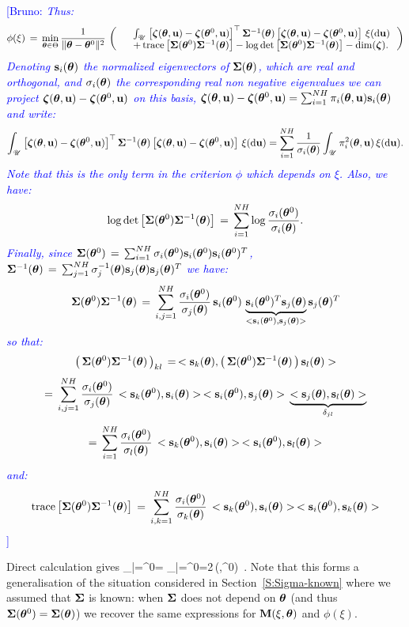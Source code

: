\documentclass{article}
\newcommand{\B}[1]{{\textcolor{blue}{[Bruno: \textit{#1}]}}}
\begin{document}
\B{Thus:
%
$$
\phi(\xi)\,=\, 
\min_{\mtb\in\Theta} \frac{1}{\|\mtb-\mtb^0\|^2} \,  \pare{ \begin{array}{ll}
&\int_\SU \left[\zetab(\mtb,\ub) - \zetab(\mtb^0,\ub)\right]\TT \Sigmab^{-1}(\mtb)\left[\zetab(\mtb,\ub) - \zetab(\mtb^0,\ub)\right] \, \xi(\dd\ub)\\
&+\, \tr\left[\Sigmab(\mtb^0)\Sigmab^{-1}(\mtb)\right] - \log \det\left[\Sigmab(\mtb^0)\Sigmab^{-1}(\mtb)\right] - \dim(\zetab).
\end{array}
%
}
$$
%
Denoting $\vs_i(\mtb)$ the normalized eigenvectors of $\Sigmab(\mtb)$, which are real and orthogonal, and $\sigma_i(\mtb)$ the corresponding real non negative eigenvalues
we can project $\zetab(\mtb,\ub) - \zetab(\mtb^0,\ub)$ on this basis, $\zetab(\mtb,\ub) - \zetab(\mtb^0,\ub) = \sum_{i=1}^{NH} \pi_i(\mtb,\ub) \vs_i(\mtb)$ and write:
%
$$
\int_\SU \left[\zetab(\mtb,\ub) - \zetab(\mtb^0,\ub)\right]\TT \Sigmab^{-1}(\mtb)\left[\zetab(\mtb,\ub) - \zetab(\mtb^0,\ub)\right] \, \xi(\dd\ub)
=\sum_{i=1}^{NH}  \frac{1}{\sigma_i(\mtb)} \int_\SU \pi_i^2(\mtb,\ub) \, \xi(\dd\ub).
$$
%
Note that this is the only term in the criterion $\phi$ which depends on $\xi$.
Also, we have:
%
$$
\log \det\left[\Sigmab(\mtb^0)\Sigmab^{-1}(\mtb)\right]  \,=\, \sum_{i=1}^{NH} \log \frac{\sigma_i(\mtb^0)}{\sigma_i(\mtb)}.
$$
%
Finally, since
$\Sigmab(\mtb^0) \,=\,\sum_{i=1}^{NH} \sigma_i(\mtb^0) \vs_i(\mtb^0) \vs_i(\mtb^0)^T$, $\Sigmab^{-1}(\mtb)\,=\,\sum_{j=1}^{NH} \sigma_j^{-1}(\mtb) \vs_j(\mtb) \vs_j(\mtb)^T$ we have:
%
$$
\Sigmab(\mtb^0)\Sigmab^{-1}(\mtb) \,=\, \sum_{i,j=1}^{NH} \frac{\sigma_i(\mtb^0)}{\sigma_j(\mtb)} \, \vs_i(\mtb^0) \, \underbrace{\vs_i(\mtb^0)^T \vs_j(\mtb)}_{<\vs_i(\mtb^0),\vs_j(\mtb)>} \vs_j(\mtb)^T
$$
%
so that:
%
$$
\pare{\Sigmab(\mtb^0)\Sigmab^{-1}(\mtb)}_{kl} \,=\, <\vs_k(\mtb),\pare{\Sigmab(\mtb^0)\Sigmab^{-1}(\mtb)}\vs_l(\mtb)>
$$
%
$$
=\, \sum_{i,j=1}^{NH} \frac{\sigma_i(\mtb^0)}{\sigma_j(\mtb)} \,<\vs_k(\mtb^0),\vs_i(\mtb)> \,<\vs_i(\mtb^0),\vs_j(\mtb)>  \,  \underbrace{<\vs_j(\mtb), \vs_l(\mtb)>}_{\delta_{jl}}
$$
%
$$
=\, \sum_{i=1}^{NH} \frac{\sigma_i(\mtb^0)}{\sigma_l(\mtb)} \, <\vs_k(\mtb^0),\vs_i(\mtb)> \,<\vs_i(\mtb^0),\vs_l(\mtb)> 
$$
and:
%
$$
\tr\left[\Sigmab(\mtb^0)\Sigmab^{-1}(\mtb)\right] \,=\, 
\sum_{i,k=1}^{NH} \frac{\sigma_i(\mtb^0)}{\sigma_k(\mtb)} \, <\vs_k(\mtb^0),\vs_i(\mtb)> \,<\vs_i(\mtb^0),\vs_k(\mtb)> 
$$
}

\bigskip

Direct calculation gives 
\bea
{}_{\big|\mtb=\mtb^0}= _{\big|\mtb=\mtb^0}=2\,\Mb(\xi,\mtb^0) \,.
\eea
Note that this forms a generalisation of the situation considered in Section~\ref{S:Sigma-known} where we assumed that $\Sigmab$ is known: when $\Sigmab$ does not depend on $\mtb$ (and thus $\Sigmab(\mtb^0)=\Sigmab(\mtb)$) we recover the same expressions for $\Mb(\xi,\mtb)$ and $\phi(\xi)$. 
\end{document}
